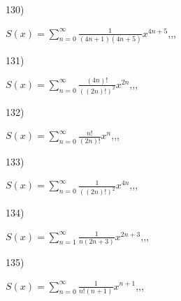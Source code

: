 \documentclass[11pt, ukrainian]{article}
\begin{document}
\par
\vspace{0.9cm}
130) \space 
{%
{$S(x)=\sum\limits_{n=0}^{\infty}{\frac{1}{(4n+1)(4n+5)}}{x^{{4n+5}}}$},,, \par \smallskip  
}
\par
\newpage
131) \space 
{%
{$S(x)=\sum\limits_{n=0}^{\infty}{\frac{(4n)!}{{((2n)!)^2}}}{x^{{2n}}}$},,, \par \smallskip  
}
\par
\vspace{0.9cm}
132) \space 
{%
{$S(x)=\sum\limits_{n=0}^{\infty}{\frac{n!}{(2n)!}}{x^{{n}}}$},,, \par \smallskip  
}
\par
\vspace{0.9cm}
133) \space 
{%
{$S(x)=\sum\limits_{n=0}^{\infty}{\frac{1}{((2n)!)^2}}{x^{{4n}}}$},,, \par \smallskip  
}
\par
\vspace{0.9cm}
134) \space 
{%
{$S(x)=\sum\limits_{n=1}^{\infty}{\frac{1}{n(2n+3)}}{x^{{2n+3}}}$},,, \par \smallskip  
}
\par
\vspace{0.9cm}
135) \space 
{%
{$S(x)=\sum\limits_{n=0}^{\infty}{\frac{1}{n!(n+1)}}{x^{{n+1}}}$},,, \par \smallskip  
}
\end{document}

